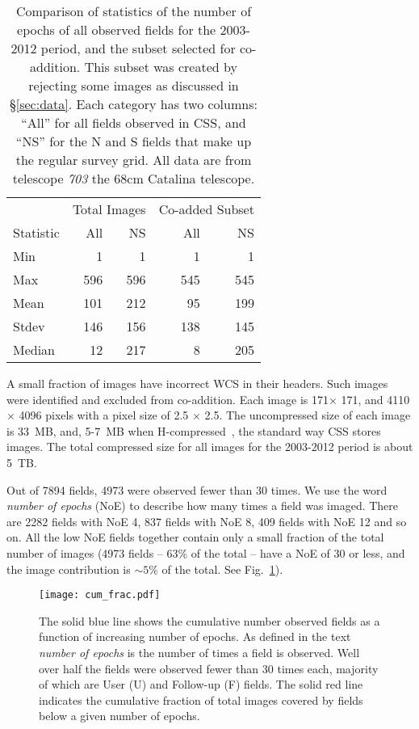 \documentclass[fleqn,usenatbib]{mnras}
\begin{document}
\begin {table}
\begin{center}
\begin{tabular}{lrrrr}
\hline
 & \multicolumn{2}{c}{Total Images} & \multicolumn{2}{c}{Co-added Subset}\\
Statistic & All & NS & All & NS \\
\hline
Min &  1 &1 & 1 & 1\\
Max  &  596 & 596& 545 &545 \\
Mean &  101 & 212& 95 &199 \\
Stdev &  146 &156 & 138 &145 \\
Median &  12 &217 & 8 &205 \\
\hline 
\end{tabular}
\caption {\label{tab:cssims} Comparison of statistics of the number of epochs of all observed fields for the 2003-2012 period, and the subset selected for co-addition. This subset was created by rejecting some images as discussed in \S\ref{sec:data}. Each category has two columns: ``All'' for all fields observed in CSS, and ``NS'' for the N and S fields that make up the regular survey grid. All data are from telescope {\it 703} the 68cm Catalina telescope.
}  
\end{center}
\end {table}


A small fraction of images have incorrect WCS in their headers. 
Such images were identified and excluded from co-addition. Each image is 171\arcmin $\times$ 171\arcmin, and 4110 $\times$ 4096 pixels with a pixel size of 2\arcsec.5 $\times$ 2\arcsec.5. The uncompressed size of each image is 33~MB, and, 5-7~MB when H-compressed~\citep{White1994}, the standard way CSS stores images. The total compressed size for all images for the 2003-2012 period is about 5~TB.

Out of 7894 fields, 4973 were observed fewer than 30 times. We use the word {\it number of epochs} (NoE) to describe how many times a field was imaged. There are 2282 fields with NoE 4, 837 fields with NoE 8, 409 fields with NoE 12 and so on. All the low NoE fields together contain only a small fraction of the total number of images (4973 fields -- 63\% of the total -- have a NoE of 30 or less, and the image contribution is $\sim5\%$ of the total. See Fig.~\ref{fig:fraction}). 


\begin{figure}
\centering
\texttt{[image: cum\_frac.pdf]}
\caption{\label{fig:fraction}The solid blue line shows the cumulative number observed fields as a function of increasing number of epochs. As defined in the text {\it number of epochs} is the number of times a field is observed. Well over half the fields were observed fewer than 30 times each, majority of which are  User  (U)  and  Follow-up  (F) fields. The solid red line indicates the cumulative fraction of total images covered by fields below a given number of epochs. }
\end{figure}
\end{document}
